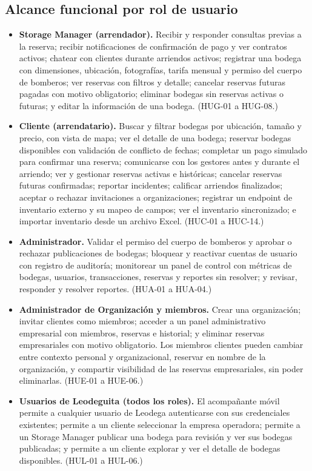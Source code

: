 \subsection*{Alcance funcional por rol de usuario}
\begin{itemize}[leftmargin=*]
    \item \textbf{Storage Manager (arrendador).} Recibir y responder consultas previas a la reserva; recibir notificaciones de confirmación de pago y ver contratos activos; chatear con clientes durante arriendos activos; registrar una bodega con dimensiones, ubicación, fotografías, tarifa mensual y permiso del cuerpo de bomberos; ver reservas con filtros y detalle; cancelar reservas futuras pagadas con motivo obligatorio; eliminar bodegas sin reservas activas o futuras; y editar la información de una bodega. (HUG-01 a HUG-08.)
    \item \textbf{Cliente (arrendatario).} Buscar y filtrar bodegas por ubicación, tamaño y precio, con vista de mapa; ver el detalle de una bodega; reservar bodegas disponibles con validación de conflicto de fechas; completar un pago simulado para confirmar una reserva; comunicarse con los gestores antes y durante el arriendo; ver y gestionar reservas activas e históricas; cancelar reservas futuras confirmadas; reportar incidentes; calificar arriendos finalizados; aceptar o rechazar invitaciones a organizaciones; registrar un endpoint de inventario externo y su mapeo de campos; ver el inventario sincronizado; e importar inventario desde un archivo Excel. (HUC-01 a HUC-14.)
    \item \textbf{Administrador.} Validar el permiso del cuerpo de bomberos y aprobar o rechazar publicaciones de bodegas; bloquear y reactivar cuentas de usuario con registro de auditoría; monitorear un panel de control con métricas de bodegas, usuarios, transacciones, reservas y reportes sin resolver; y revisar, responder y resolver reportes. (HUA-01 a HUA-04.)
    \item \textbf{Administrador de Organización y miembros.} Crear una organización; invitar clientes como miembros; acceder a un panel administrativo empresarial con miembros, reservas e historial; y eliminar reservas empresariales con motivo obligatorio. Los miembros clientes pueden cambiar entre contexto personal y organizacional, reservar en nombre de la organización, y compartir visibilidad de las reservas empresariales, sin poder eliminarlas. (HUE-01 a HUE-06.)
    \item \textbf{Usuarios de Leodeguita (todos los roles).} El acompañante móvil permite a cualquier usuario de Leodega autenticarse con sus credenciales existentes; permite a un cliente seleccionar la empresa operadora; permite a un Storage Manager publicar una bodega para revisión y ver sus bodegas publicadas; y permite a un cliente explorar y ver el detalle de bodegas disponibles. (HUL-01 a HUL-06.)
\end{itemize}

